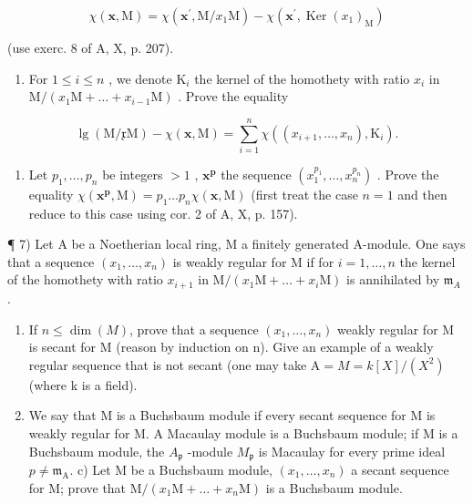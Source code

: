 \[
\chi (\mathbf {x}, \mathrm{M}) = \chi (\mathbf {x} ^ {\prime}, \mathrm{M} / x _ {1} \mathrm{M}) - \chi (\mathbf {x} ^ {\prime}, \operatorname{Ker} (x _ {1}) _ {\mathrm{M}})
\]

(use exerc. 8 of A, X, p. 207).

\begin{enumerate}
\def\labelenumi{\alph{enumi})}
\setcounter{enumi}{3}
\tightlist
\item
  For \(1 \leqslant i \leqslant n\) , we denote \(\mathrm{K}_i\) the kernel of the homothety with ratio \(x_i\) in \(\mathrm{M}/(x_1\mathrm{M} + \ldots + x_{i-1}\mathrm{M})\) . Prove the equality
\end{enumerate}

\[
\lg (\mathrm{M} / \mathfrak {x} \mathrm{M}) - \chi (\mathbf {x}, \mathrm{M}) = \sum_ {i = 1} ^ {n} \chi ((x _ {i + 1}, \dots , x _ {n}), \mathrm{K} _ {i}).
\]

\begin{enumerate}
\def\labelenumi{\alph{enumi})}
\setcounter{enumi}{4}
\tightlist
\item
  Let \(p_1, \ldots, p_n\) be integers \(> 1\) , \(\mathbf{x}^{\mathbf{p}}\) the sequence \((x_{1}^{p_1}, \ldots, x_n^{p_n})\) . Prove the equality \(\chi(\mathbf{x}^{\mathbf{p}}, \mathrm{M}) = p_1 \ldots p_n \chi(\mathbf{x}, \mathrm{M})\) (first treat the case \(n = 1\) and then reduce to this case using cor. 2 of A, X, p. 157).
\end{enumerate}

¶ 7) Let A be a Noetherian local ring, M a finitely generated A-module. One says that a sequence \((x_1, \ldots, x_n)\) is weakly regular for M if for \(i = 1, \ldots, n\) the kernel of the homothety with ratio \(x_{i+1}\) in \(\mathrm{M}/(x_1\mathrm{M} + \ldots + x_i\mathrm{M})\) is annihilated by \(\mathfrak{m}_A\) .

\begin{enumerate}
\def\labelenumi{\alph{enumi})}
\item
  If \(n \leqslant \dim(M)\), prove that a sequence \((x_{1}, \ldots, x_{n})\) weakly regular for M is secant for M (reason by induction on n). Give an example of a weakly regular sequence that is not secant (one may take \(\mathrm{A} = M = k[X]/(X^{2})\) (where k is a field).
\item
  We say that M is a Buchsbaum module if every secant sequence for M is weakly regular for M. A Macaulay module is a Buchsbaum module; if M is a Buchsbaum module, the \(A_{\mathfrak{p}}\) -module \(M_{\mathfrak{p}}\) is Macaulay for every prime ideal \(p \neq \mathfrak{m}_{\mathrm{A}}\). c) Let M be a Buchsbaum module, \((x_{1}, \ldots, x_{n})\) a secant sequence for M; prove that \(\mathrm{M}/(x_{1}\mathrm{M} + \ldots + x_{n}\mathrm{M})\) is a Buchsbaum module.
\end{enumerate}

